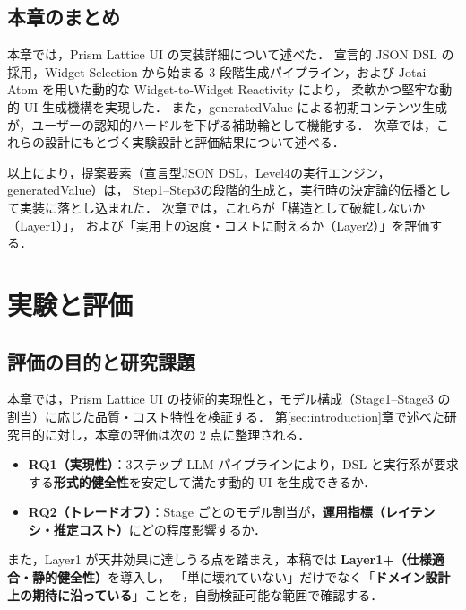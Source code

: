 \documentclass[a4paper,10pt]{jarticle}
\begin{document}
\subsection{本章のまとめ}
本章では，Prism Lattice UI の実装詳細について述べた．
宣言的 JSON DSL の採用，Widget Selection から始まる 3 段階生成パイプライン，および Jotai Atom を用いた動的な Widget-to-Widget Reactivity により，
柔軟かつ堅牢な動的 UI 生成機構を実現した．
また，generatedValue による初期コンテンツ生成が，ユーザーの認知的ハードルを下げる補助輪として機能する．
次章では，これらの設計にもとづく実験設計と評価結果について述べる．

以上により，提案要素（宣言型JSON DSL，Level4の実行エンジン，generatedValue）は，
Step1--Step3の段階的生成と，実行時の決定論的伝播として実装に落とし込まれた．
次章では，これらが「構造として破綻しないか（Layer1）」，
および「実用上の速度・コストに耐えるか（Layer2）」を評価する．




\section{実験と評価}
\label{sec:evaluation}

\subsection{評価の目的と研究課題}
本章では，Prism Lattice UI の技術的実現性と，モデル構成（Stage1--Stage3 の割当）に応じた品質・コスト特性を検証する．
第\ref{sec:introduction}章で述べた研究目的に対し，本章の評価は次の 2 点に整理される．

\begin{itemize}
  \item \textbf{RQ1（実現性）}：3ステップ LLM パイプラインにより，DSL と実行系が要求する\textbf{形式的健全性}を安定して満たす動的 UI を生成できるか．
  \item \textbf{RQ2（トレードオフ）}：Stage ごとのモデル割当が，\textbf{運用指標（レイテンシ・推定コスト）}にどの程度影響するか．
\end{itemize}

また，Layer1 が天井効果に達しうる点を踏まえ，本稿では \textbf{Layer1+（仕様適合・静的健全性）}を導入し，
「単に壊れていない」だけでなく「\textbf{ドメイン設計上の期待に沿っている}」ことを，自動検証可能な範囲で確認する．
\end{document}
